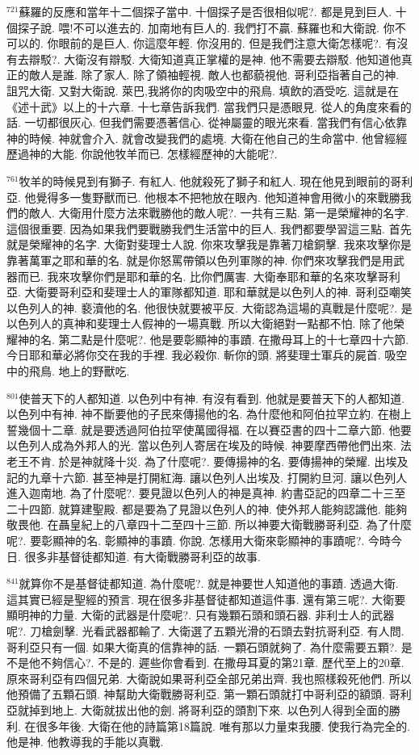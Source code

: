 \documentclass{book}
\begin{document}
$^{721}$蘇羅的反應和當年十二個探子當中.
十個探子是否很相似呢?.
都是見到巨人.
十個探子說.
喂!不可以進去的.
加南地有巨人的.
我們打不贏.
蘇羅也和大衛說.
你不可以的.
你眼前的是巨人.
你這麼年輕.
你沒用的.
但是我們注意大衛怎樣呢?.
有沒有去辯駁?.
大衛沒有辯駁.
大衛知道真正掌權的是神.
他不需要去辯駁.
他知道他真正的敵人是誰.
除了家人.
除了領袖輕視.
敵人也都藐視他.
哥利亞指著自己的神.
詛咒大衛.
又對大衛說.
萊巴,我將你的肉吸空中的飛鳥.
填飲的酒受吃.
這就是在《述十武》以上的十六章.
十七章告訴我們.
當我們只是憑眼見.
從人的角度來看的話.
一切都很灰心.
但我們需要憑著信心.
從神屬靈的眼光來看.
當我們有信心依靠神的時候.
神就會介入.
就會改變我們的處境.
大衛在他自己的生命當中.
他曾經經歷過神的大能.
你說他牧羊而已.
怎樣經歷神的大能呢?.

$^{761}$牧羊的時候見到有獅子.
有紅人.
他就殺死了獅子和紅人.
現在他見到眼前的哥利亞.
他覺得多一隻野獸而已.
他根本不把牠放在眼內.
他知道神會用微小的來戰勝我們的敵人.
大衛用什麼方法來戰勝他的敵人呢?.
一共有三點.
第一是榮耀神的名字.
這個很重要.
因為如果我們要戰勝我們生活當中的巨人.
我們都要學習這三點.
首先就是榮耀神的名字.
大衛對斐理士人說.
你來攻擊我是靠著刀槍銅擊.
我來攻擊你是靠著萬軍之耶和華的名.
就是你怒罵帶領以色列軍隊的神.
你們來攻擊我們是用武器而已.
我來攻擊你們是耶和華的名.
比你們厲害.
大衛奉耶和華的名來攻擊哥利亞.
大衛要哥利亞和斐理士人的軍隊都知道.
耶和華就是以色列人的神.
哥利亞嘲笑以色列人的神.
褻瀆他的名.
他很快就要被平反.
大衛認為這場的真戰是什麼呢?.
是以色列人的真神和斐理士人假神的一場真戰.
所以大衛絕對一點都不怕.
除了他榮耀神的名.
第二點是什麼呢?.
他是要彰顯神的事蹟.
在撒母耳上的十七章四十六節.
今日耶和華必將你交在我的手裡.
我必殺你.
斬你的頭.
將斐理士軍兵的屍首.
吸空中的飛鳥.
地上的野獸吃.

$^{801}$使普天下的人都知道.
以色列中有神.
有沒有看到.
他就是要普天下的人都知道.
以色列中有神.
神不斷要他的子民來傳揚他的名.
為什麼他和阿伯拉罕立約.
在樹上誓幾個十二章.
就是要透過阿伯拉罕使萬國得福.
在以賽亞書的四十二章六節.
他要以色列人成為外邦人的光.
當以色列人寄居在埃及的時候.
神要摩西帶他們出來.
法老王不肯.
於是神就降十災.
為了什麼呢?.
要傳揚神的名.
要傳揚神的榮耀.
出埃及記的九章十六節.
甚至神是打開紅海.
讓以色列人出埃及.
打開約旦河.
讓以色列人進入迦南地.
為了什麼呢?.
要見證以色列人的神是真神.
約書亞記的四章二十三至二十四節.
就算建聖殿.
都是要為了見證以色列人的神.
使外邦人能夠認識他.
能夠敬畏他.
在聶皇紀上的八章四十二至四十三節.
所以神要大衛戰勝哥利亞.
為了什麼呢?.
要彰顯神的名.
彰顯神的事蹟.
你說.
怎樣用大衛來彰顯神的事蹟呢?.
今時今日.
很多非基督徒都知道.
有大衛戰勝哥利亞的故事.

$^{841}$就算你不是基督徒都知道.
為什麼呢?.
就是神要世人知道他的事蹟.
透過大衛.
這其實已經是聖經的預言.
現在很多非基督徒都知道這件事.
還有第三呢?.
大衛要顯明神的力量.
大衛的武器是什麼呢?.
只有幾顆石頭和頭石器.
非利士人的武器呢?.
刀槍劍擊.
光看武器都輸了.
大衛選了五顆光滑的石頭去對抗哥利亞.
有人問.
哥利亞只有一個.
如果大衛真的信靠神的話.
一顆石頭就夠了.
為什麼需要五顆?.
是不是他不夠信心?.
不是的.
遲些你會看到.
在撒母耳夏的第21章.
歷代至上的20章.
原來哥利亞有四個兄弟.
大衛說如果哥利亞全部兄弟出齊.
我也照樣殺死他們.
所以他預備了五顆石頭.
神幫助大衛戰勝哥利亞.
第一顆石頭就打中哥利亞的額頭.
哥利亞就掉到地上.
大衛就拔出他的劍.
將哥利亞的頭割下來.
以色列人得到全面的勝利.
在很多年後.
大衛在他的詩篇第18篇說.
唯有那以力量束我腰.
使我行為完全的.
他是神.
他教導我的手能以真戰.
\end{document}
